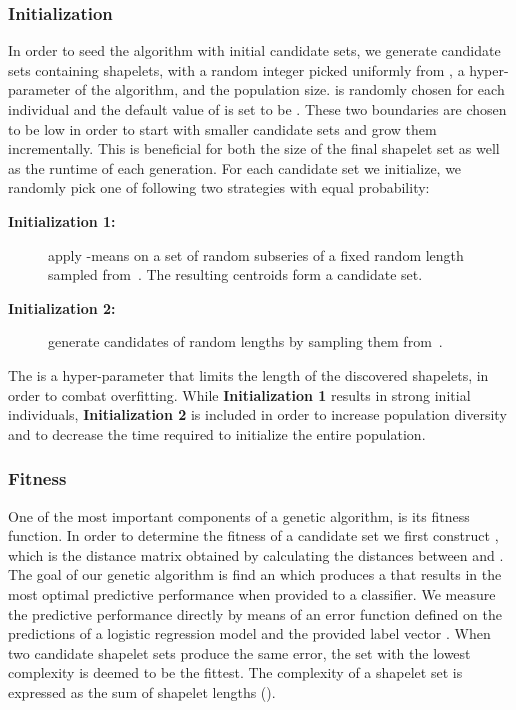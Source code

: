 \documentclass[runningheads]{llncs}
\begin{document}
\subsubsection{Initialization}\label{subsubsec:initialization}

In order to seed the algorithm with initial candidate sets, we generate  candidate sets  containing  shapelets, with  a random integer picked uniformly from ,  a hyper-parameter of the algorithm, and  the population size.  is randomly chosen for each individual and the default value of  is set to be . These two boundaries are chosen to be low in order to start with smaller candidate sets and grow them incrementally. This is beneficial for both the size of the final shapelet set as well as the runtime of each generation. For each candidate set we initialize, we randomly pick one of following two strategies with equal probability:
\begin{description}
	\item [\textbf{Initialization 1:}] apply -means on a set of random subseries of a fixed random length sampled from~. The  resulting centroids form a candidate set.
	\item [\textbf{Initialization 2:}] generate  candidates of random lengths  by sampling them from~.
\end{description}

The  is a hyper-parameter that limits the length of the discovered shapelets, in order to combat overfitting. While \textbf{Initialization 1} results in strong initial individuals, \textbf{Initialization 2} is included in order to increase population diversity and to decrease the time required to initialize the entire population.

\subsubsection{Fitness}\label{subsubsec:fitness}

One of the most important components of a genetic algorithm, is its fitness function. In order to determine the fitness of a candidate set  we first construct , which is the distance matrix obtained by calculating the distances between  and . The goal of our genetic algorithm is find an  which produces a  that results in the most optimal predictive performance when provided to a classifier. We measure the predictive performance directly by means of an error function defined on the predictions of a logistic regression model and the provided label vector . When two candidate shapelet sets produce the same error, the set with the lowest complexity is deemed to be the fittest. The complexity of a shapelet set is expressed as the sum of shapelet lengths (). \\
\end{document}
